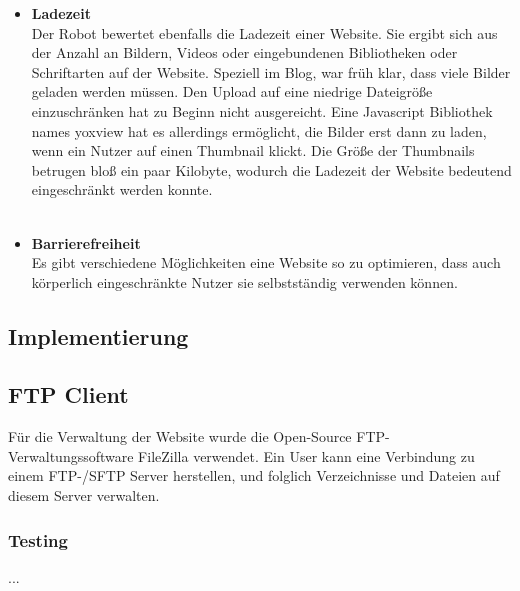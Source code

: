 {\begin{itemize}
        Nicht jeder Browser stellt jede Seite gleich dar. Die Tags werden unterschiedlich, oder sogar garnicht verstanden. Wird dies nicht beachtet, wirkt sich das auf die Nutzerfreundlichkeit,
        und damit auch auf die Bewertung der Website aus. Um dies zu verhindern gibt es Tools wie zum Beispiel caniuse.com in denen genau verzeichnet ist, welcher Tag, oder welche CSS-Eigenschaft
        von welchem Browser, beziehungsweise welcher Browserversion unterstützt wird.\\
        \\
      \item \textbf{Ladezeit}\\
        Der Robot bewertet ebenfalls die Ladezeit einer Website. Sie ergibt sich aus der Anzahl an Bildern, Videos oder eingebundenen Bibliotheken oder Schriftarten auf der Website.
        Speziell im Blog, war früh klar, dass viele Bilder geladen werden müssen. Den Upload auf eine niedrige Dateigröße einzuschränken hat zu Beginn nicht ausgereicht.
        Eine Javascript Bibliothek names yoxview hat es allerdings ermöglicht, die Bilder erst dann zu laden, wenn ein Nutzer auf einen Thumbnail klickt. Die Größe der Thumbnails betrugen bloß
        ein paar Kilobyte, wodurch die Ladezeit der Website bedeutend eingeschränkt werden konnte.\\
        \\
      \item \textbf{Barrierefreiheit}\\
        Es gibt verschiedene Möglichkeiten eine Website so zu optimieren, dass auch körperlich eingeschränkte Nutzer sie selbstständig verwenden können.
    \end{itemize}

  \subsection{Implementierung}

    \subsection{FTP Client}
    Für die Verwaltung der Website wurde die Open-Source FTP-Verwaltungssoftware FileZilla verwendet. Ein User kann eine Verbindung zu einem FTP-/SFTP
    Server herstellen, und folglich Verzeichnisse und Dateien auf diesem Server verwalten.

    \subsubsection{Testing}
    ...

}

